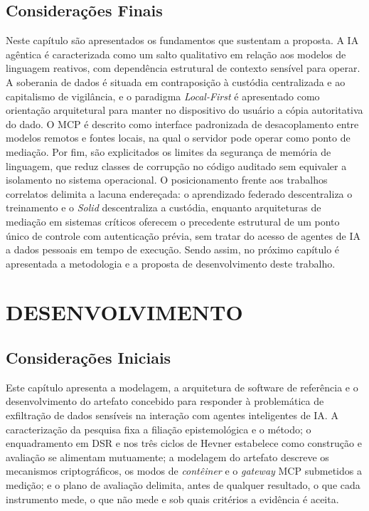 \documentclass[12pt,openright,twoside,a4paper,english,brazil]{abntex2}
\begin{document}
\section{Considerações Finais}

Neste capítulo são apresentados os fundamentos que sustentam a proposta. A IA agêntica é caracterizada como um salto qualitativo em relação aos modelos de linguagem reativos, com dependência estrutural de contexto sensível para operar. A soberania de dados é situada em contraposição à custódia centralizada e ao capitalismo de vigilância, e o paradigma \textit{Local-First} é apresentado como orientação arquitetural para manter no dispositivo do usuário a cópia autoritativa do dado. O MCP é descrito como interface padronizada de desacoplamento entre modelos remotos e fontes locais, na qual o servidor pode operar como ponto de mediação. Por fim, são explicitados os limites da segurança de memória de linguagem, que reduz classes de corrupção no código auditado sem equivaler a isolamento no sistema operacional. O posicionamento frente aos trabalhos correlatos delimita a lacuna endereçada: o aprendizado federado descentraliza o treinamento e o \textit{Solid} descentraliza a custódia, enquanto arquiteturas de mediação em sistemas críticos oferecem o precedente estrutural de um ponto único de controle com autenticação prévia, sem tratar do acesso de agentes de IA a dados pessoais em tempo de execução. Sendo assim, no próximo capítulo é apresentada a metodologia e a proposta de desenvolvimento deste trabalho.

\chapter{DESENVOLVIMENTO}
\section{Considerações Iniciais}
Este capítulo apresenta a modelagem, a arquitetura de software de referência e o desenvolvimento do artefato concebido para responder à problemática de exfiltração de dados sensíveis na interação com agentes inteligentes de IA. A caracterização da pesquisa fixa a filiação epistemológica e o método; o enquadramento em DSR e nos três ciclos de Hevner estabelece como construção e avaliação se alimentam mutuamente; a modelagem do artefato descreve os mecanismos criptográficos, os modos de \textit{contêiner} e o \textit{gateway} MCP submetidos a medição; e o plano de avaliação delimita, antes de qualquer resultado, o que cada instrumento mede, o que não mede e sob quais critérios a evidência é aceita.
\end{document}

